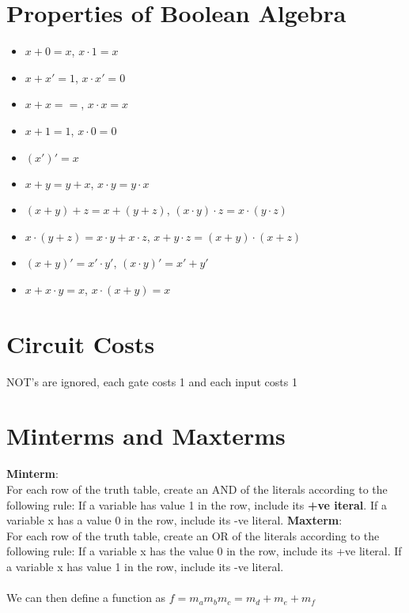 \documentclass[12pt]{report}
\begin{document}
	\section{Properties of Boolean Algebra}
		\begin{itemize}
			\item $x + 0 = x$, $x \cdot 1 = x$
			\item $x + x' = 1$, $x \cdot x' = 0$
			\item $x + x = =$, $x \cdot x = x$
			\item $x + 1 = 1$, $x \cdot 0 = 0$
			\item $(x')' = x$
			\item $x + y = y + x$, $x \cdot y = y \cdot x$
			\item $(x + y) + z = x + (y + z)$, $(x\cdot y)\cdot z = x \cdot (y \cdot z)$
			\item $x\cdot (y + z) = x\cdot y + x\cdot z$, $x + y\cdot z = (x+y)\cdot(x+z)$
			\item $(x + y)' = x' \cdot y'$, $(x\cdot y)' = x' + y'$
			\item $x + x\cdot y = x$, $ x\cdot (x + y) = x$
		\end{itemize}
	\section{Circuit Costs}
		NOT's are ignored, each gate costs 1 and each input costs 1
	\section{Minterms and Maxterms}
		\textbf{Minterm}:\\
		For each row of the truth table, create an AND of the literals according to the following rule: If a variable has value 1 in the row, include its \textbf{+ve iteral}. If a variable x has a value 0 in the row, include its -ve literal.
		\textbf{Maxterm}:\\
		For each row of the truth table, create an OR of the literals according to the following rule: If a variable x has the value 0 in the row, include its +ve literal. If a variable x has value 1 in the row, include its -ve literal. 
		\\
		\\
		We can then define a function as $f = m_am_bm_c = m_d + m_e + m_f$
\end{document}
